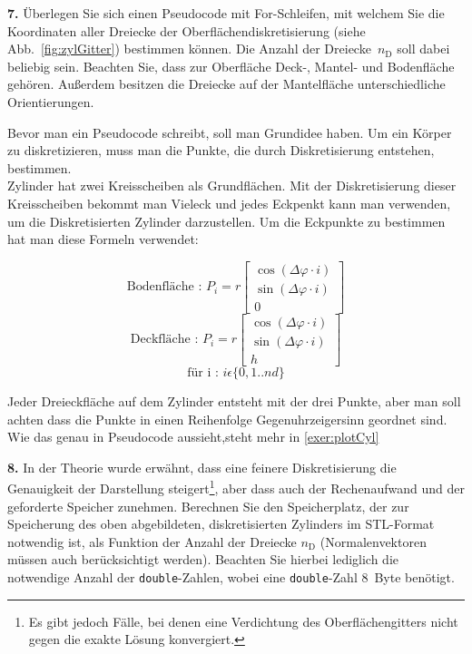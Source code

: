 \documentclass[Protokollheft.tex]{subfiles}
\begin{document}
    \begin{framed}
	\noindent \textbf{7.} Überlegen Sie sich einen Pseudocode mit For-Schleifen, mit welchem Sie die Koordinaten aller Dreiecke der Oberflächendiskretisierung (siehe Abb.~\ref{fig:zylGitter}) bestimmen können. Die Anzahl der Dreiecke~$n_\text{D}$ soll dabei beliebig sein. Beachten Sie, dass zur Oberfläche Deck-, Mantel- und Bodenfläche gehören. Außerdem besitzen die Dreiecke auf der Mantelfläche \glqq unterschiedliche Orientierungen\grqq.\label{exer:pseudocodeCylinder}
\end{framed}

	Bevor man ein Pseudocode schreibt, soll man Grundidee haben. Um ein Körper zu diskretizieren, muss man die Punkte, die durch Diskretisierung entstehen, bestimmen. \\
	Zylinder hat zwei Kreisscheiben als Grundflächen. Mit der Diskretisierung dieser Kreisscheiben bekommt man Vieleck und jedes Eckpenkt kann man verwenden, um die Diskretisierten Zylinder darzustellen. Um  die Eckpunkte zu bestimmen hat man diese Formeln verwendet:
	
	$$\text{Bodenfläche : }P_i = r
	\begin{bmatrix}\cos(\Delta \varphi \cdot i) \\ \sin(\Delta \varphi\cdot i) \\ 0 \end{bmatrix}
	 $$
	 	$$\text{Deckfläche : }P_i = r
	 \begin{bmatrix}\cos(\Delta \varphi \cdot i) \\ \sin(\Delta \varphi\cdot i) \\ h \end{bmatrix}
	 $$
	 $$\text{für i :  } i \epsilon \{0,1..nd \}$$
	 
	 Jeder Dreieckfläche auf dem Zylinder entsteht mit der drei Punkte, aber man soll achten dass die Punkte in einen Reihenfolge Gegenuhrzeigersinn geordnet sind. Wie das genau in Pseudocode aussieht,steht mehr in \ref{exer:plotCyl}  
	

    \begin{framed}
	\noindent \textbf{8.} In der Theorie wurde erwähnt, dass eine feinere Diskretisierung die Genauigkeit der Darstellung steigert\footnote{Es gibt jedoch Fälle, bei denen eine Verdichtung des Oberflächengitters nicht gegen die exakte Lösung konvergiert.}, aber dass auch der Rechenaufwand und der geforderte Speicher zunehmen.
        Berechnen Sie den Speicherplatz, der zur Speicherung des oben abgebildeten, diskretisierten Zylinders im STL-Format notwendig ist, als Funktion der Anzahl der Dreiecke $n_\mathrm{D}$ (Normalenvektoren müssen auch berücksichtigt werden). Beachten Sie hierbei lediglich die notwendige Anzahl der \lstinline{double}-Zahlen, wobei eine \lstinline{double}-Zahl \SI{8}{Byte} benötigt.\label{exer:requiredStorage}
\end{framed}
\end{document}
